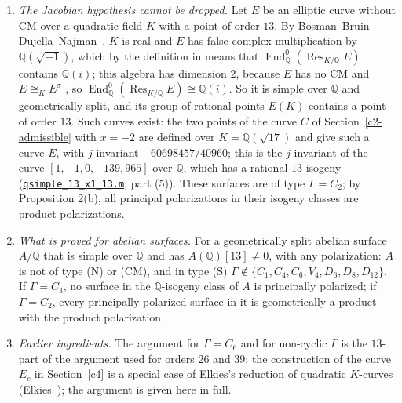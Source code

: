 \documentclass[11pt]{article}
\newcommand{\Q}{\mathbb Q}
\DeclareMathOperator{\End}{End}
\begin{document}
\begin{enumerate}
\item \emph{The Jacobian hypothesis cannot be dropped.} Let \(E\) be an elliptic curve without CM over a
          quadratic field \(K\) with a point of order \(13\). By Bosman--Bruin--Dujella--Najman~\cite[Theorem 9(1)]{BBDN}, \(K\) is real and
          \(E\) has false complex multiplication by \(\Q(\sqrt{-1})\), which by the definition in \cite[§4.1]{BBDN} means that
          \(\End^0_{\Q}(\operatorname{Res}_{K/\Q}E)\) contains \(\Q(i)\); this algebra has dimension \(2\), because
          \(E\) has no CM and \(E\cong_K E^\sigma\) \cite[Theorem 11(1)]{BBDN}, so
          \(\End^0_{\Q}(\operatorname{Res}_{K/\Q}E)\cong\Q(i)\). So it is simple over \(\Q\) and geometrically
          split, and its group of rational points \(E(K)\) contains a point of order \(13\). Such curves exist: the
          two points of the curve \(C\) of Section~\ref{c2-admissible} with \(x=-2\) are defined over \(K=\Q(\sqrt{17})\)
          and give such a curve \(E\), with \(j\)-invariant \(-60698457/40960\); this is the \(j\)-invariant of the curve
          \([1,-1,0,-139,965]\) over \(\Q\), which has a rational \(13\)-isogeny
          (\href{https://genus-2-torsion.github.io/data/knowledge/sources/qsimple_13_x1_13.m}{\texttt{qsimple\_\allowbreak{}13\_\allowbreak{}x1\_\allowbreak{}13.m}}, part (5)). These surfaces are of type \(\Gamma=C_2\); by Proposition 2(b), all
          principal polarizations in their isogeny classes are product polarizations.
\item \emph{What is proved for abelian surfaces.} For a geometrically split abelian surface \(A/\Q\) that
          is simple over \(\Q\) and has \(A(\Q)[13]\neq0\), with any polarization: \(A\) is not of type (N) or (CM),
          and in type (S) \(\Gamma\notin\{C_1,C_4,C_6,V_4,D_6,D_8,D_{12}\}\). If \(\Gamma=C_3\), no surface in the
          \(\Q\)-isogeny class of \(A\) is principally polarized; if \(\Gamma=C_2\), every principally polarized
          surface in it is geometrically a product with the product polarization.
\item \emph{Earlier ingredients.} The argument for \(\Gamma=C_6\) and for non-cyclic \(\Gamma\) is the
          \(13\)-part of the argument used for orders \(26\) and \(39\); the construction of the curve \(E_c\)
          in Section~\ref{c4} is a special case of Elkies's reduction of quadratic \(K\)-curves
          (Elkies~\cite{Elk}); the argument is given here in full.
\end{enumerate}
\end{document}
